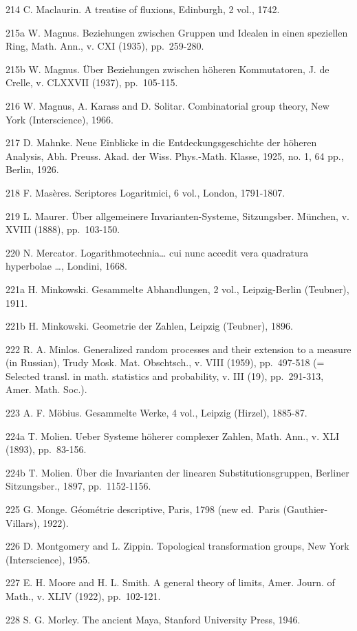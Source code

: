 214 C. Maclaurin. A treatise of fluxions, Edinburgh, 2 vol., 1742.

215a W. Magnus. Beziehungen zwischen Gruppen und Idealen in einen speziellen Ring, Math. Ann., v. CXI (1935), pp.~259-280.

215b W. Magnus. Über Beziehungen zwischen höheren Kommutatoren, J. de Crelle, v. CLXXVII (1937), pp.~105-115.

216 W. Magnus, A. Karass and D. Solitar. Combinatorial group theory, New York (Interscience), 1966.

217 D. Mahnke. Neue Einblicke in die Entdeckungsgeschichte der höheren Analysis, Abh. Preuss. Akad. der Wiss. Phys.-Math. Klasse, 1925, no. 1, 64 pp., Berlin, 1926.

218 F. Masères. Scriptores Logaritmici, 6 vol., London, 1791-1807.

219 L. Maurer. Über allgemeinere Invarianten-Systeme, Sitzungsber. München, v. XVIII (1888), pp.~103-150.

220 N. Mercator. Logarithmotechnia\ldots{} cui nunc accedit vera quadratura hyperbolae \ldots, Londini, 1668.

221a H. Minkowski. Gesammelte Abhandlungen, 2 vol., Leipzig-Berlin (Teubner), 1911.

221b H. Minkowski. Geometrie der Zahlen, Leipzig (Teubner), 1896.

222 R. A. Minlos. Generalized random processes and their extension to a measure (in Russian), Trudy Mosk. Mat. Obschtsch., v. VIII (1959), pp.~497-518 (= Selected transl. in math. statistics and probability, v. III (19), pp.~291-313, Amer. Math. Soc.).

223 A. F. Möbius. Gesammelte Werke, 4 vol., Leipzig (Hirzel), 1885-87.

224a T. Molien. Ueber Systeme höherer complexer Zahlen, Math. Ann., v. XLI (1893), pp.~83-156.

224b T. Molien. Über die Invarianten der linearen Substitutionsgruppen, Berliner Sitzungsber., 1897, pp.~1152-1156.

225 G. Monge. Géométrie descriptive, Paris, 1798 (new ed.~Paris (Gauthier-Villars), 1922).

226 D. Montgomery and L. Zippin. Topological transformation groups, New York (Interscience), 1955.

227 E. H. Moore and H. L. Smith. A general theory of limits, Amer. Journ. of Math., v. XLIV (1922), pp.~102-121.

228 S. G. Morley. The ancient Maya, Stanford University Press, 1946.


